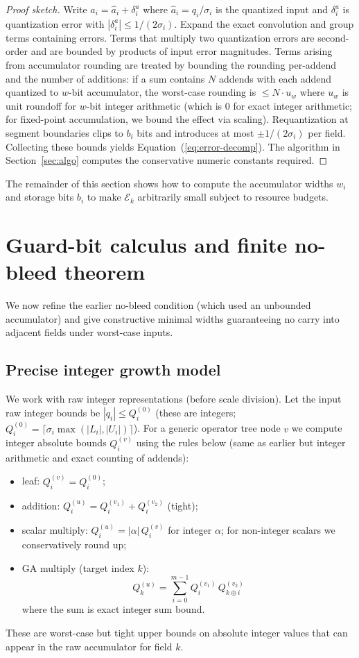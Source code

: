 \documentclass[11pt]{article}
\theoremstyle{definition}
\theoremstyle{plain}
\begin{document}
\begin{proof}[Proof sketch]
Write $a_i = \hat a_i + \delta^a_i$ where $\hat a_i = q_i/\sigma_i$ is the quantized input and $\delta^a_i$ is quantization error with $|\delta^a_i|\le 1/(2\sigma_i)$. Expand the exact convolution and group terms containing errors. Terms that multiply two quantization errors are second-order and are bounded by products of input error magnitudes. Terms arising from accumulator rounding are treated by bounding the rounding per-addend and the number of additions: if a sum contains $N$ addends with each addend quantized to $w$-bit accumulator, the worst-case rounding is $\le N\cdot u_w$ where $u_w$ is unit roundoff for $w$-bit integer arithmetic (which is 0 for exact integer arithmetic; for fixed-point accumulation, we bound the effect via scaling). Requantization at segment boundaries clips to $b_i$ bits and introduces at most $\pm 1/(2\sigma_i)$ per field. Collecting these bounds yields Equation~(\ref{eq:error-decomp}). The algorithm in Section~\ref{sec:algo} computes the conservative numeric constants required.
\end{proof}

The remainder of this section shows how to compute the accumulator widths $w_i$ and storage bits $b_i$ to make $\mathcal{E}_k$ arbitrarily small subject to resource budgets.

\section{Guard-bit calculus and finite no-bleed theorem}
\label{sec:guardcalc-finite}
We now refine the earlier no-bleed condition (which used an unbounded accumulator) and give constructive minimal widths guaranteeing no carry into adjacent fields under worst-case inputs.

\subsection{Precise integer growth model}
We work with raw integer representations (before scale division). Let the input raw integer bounds be $|q_i|\le Q^{(0)}_i$ (these are integers; $Q^{(0)}_i = \lceil \sigma_i \max(|L_i|,|U_i|) \rceil$).  For a generic operator tree node $v$ we compute integer absolute bounds $Q^{(v)}_i$ using the rules below (same as earlier but integer arithmetic and exact counting of addends):
\begin{itemize}
  \item leaf: $Q^{(v)}_i = Q^{(0)}_i$;
  \item addition: $Q^{(u)}_i = Q^{(v_1)}_i + Q^{(v_2)}_i$ (tight);
  \item scalar multiply: $Q^{(u)}_i = |\alpha|\, Q^{(v)}_i$ for integer $\alpha$; for non-integer scalars we conservatively round up;
  \item GA multiply (target index $k$):
  $$
  Q^{(u)}_k = \sum_{i=0}^{m-1} Q^{(v_1)}_i\, Q^{(v_2)}_{k\oplus i}
  $$
  where the sum is exact integer sum bound.
\end{itemize}
These are worst-case but tight upper bounds on absolute integer values that can appear in the raw accumulator for field $k$.
\end{document}
